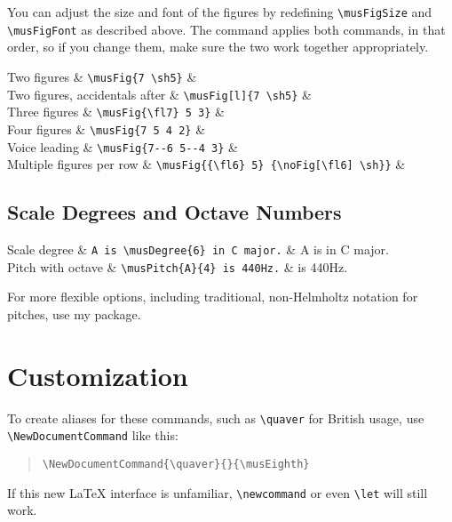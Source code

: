 \documentclass{article}
\begin{document}
You can adjust the size and font of the figures by redefining
\verb|\musFigSize| and \verb|\musFigFont| as described above.
The command applies both commands, in that order, so if you change them, make
sure the two work together appropriately.

{\renewcommand{\arraystretch}{2.5}
\small
\begin{codetable}
    Two figures & \verb|\musFig{7 \sh5}| 
    & \\
    Two figures, accidentals after & \verb|\musFig[l]{7 \sh5}| 
    & \\
    Three figures & \verb|\musFig{\fl7} 5 3}| 
    & \\
    Four figures & \verb|\musFig{7 5 4 2}| &
    \\
    Voice leading & \verb|\musFig{7--6 5--4 3}| 
    & \\
    Multiple figures per row 
    & \verb|\musFig{{\fl6} 5} {\noFig[\fl6] \sh}}|
    & \\
\end{codetable}}

\subsection{Scale Degrees and Octave Numbers}

\begin{codetable}
    Scale degree & \verb|A is \musDegree{6} in C major.|
    & A is  in C major. \\
    Pitch with octave & \verb|\musPitch{A}{4} is 440Hz.|
    &  is 440Hz. \\
\end{codetable}

For more flexible options, including traditional, non-Helmholtz notation for
pitches, use my  package.

\section{Customization}

To create aliases for these commands, such as \verb|\quaver| for British
usage, use \verb|\NewDocumentCommand| like this:
\begin{quote}
    \verb|\NewDocumentCommand{\quaver}{}{\musEighth}|
\end{quote}
If this new LaTeX interface is unfamiliar, \verb|\newcommand| or even
\verb|\let| will still work.
\end{document}
